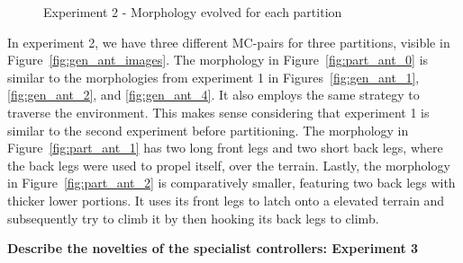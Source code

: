             \begin{figure}[ht]
                \centering
                \hfill
                \hfill
                \caption{Experiment 2 - Morphology evolved for each partition}
                \label{fig:part_ant_images}
            \end{figure}
            In experiment 2, we have three different MC-pairs for three partitions, visible in Figure~\ref{fig:gen_ant_images}. The morphology in Figure~\ref{fig:part_ant_0} is similar to the morphologies from experiment 1 in Figures~\ref{fig:gen_ant_1}, \ref{fig:gen_ant_2}, and \ref{fig:gen_ant_4}. It also employs the same strategy to traverse the environment. This makes sense considering that experiment 1 is similar to the second experiment before partitioning. The morphology in Figure~\ref{fig:part_ant_1} has two long front legs and two short back legs, where the back legs were used to propel itself, over the terrain. Lastly, the morphology in Figure~\ref{fig:part_ant_2} is comparatively smaller, featuring two back legs with thicker lower portions. It uses its front legs to latch onto a elevated terrain and subsequently try to climb it by then hooking its back legs to climb.

            \textbf{Describe the novelties of the specialist controllers: Experiment 3}


